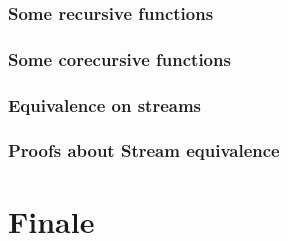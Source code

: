 \documentclass[xetex]{beamer}
\begin{document}
\begin{frame}
\frametitle{Some recursive functions}
\end{frame}


\begin{frame}
\frametitle{Some corecursive functions}
\end{frame}


\begin{frame}
\frametitle{Equivalence on streams}
\end{frame}

\begin{frame}
\frametitle{Proofs about Stream equivalence}
\end{frame}


\section{Finale}
\end{document}
